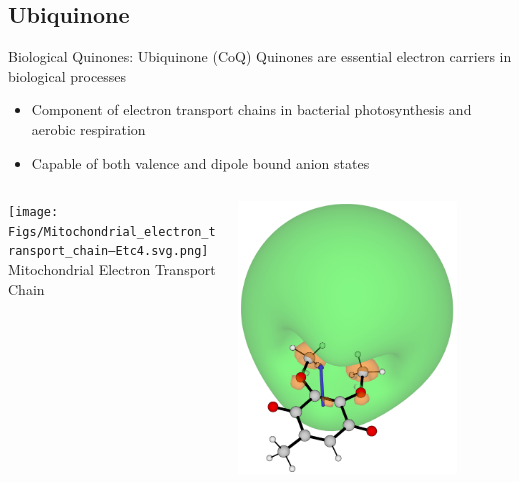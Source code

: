 \documentclass[9pt,t,xcolor=table]{beamer}
\begin{document}
\subsection{Ubiquinone}
\begin{frame}{\huge Biological Quinones: Ubiquinone (CoQ)}\large
	Quinones are essential electron carriers in biological processes
		\vspace{5pt}
		\begin{itemize}
		\item Component of electron transport chains in bacterial photosynthesis and aerobic respiration	
		\item Capable of both valence and dipole bound anion states
		\end{itemize}
		\begin{columns}[b]
			\begin{column}[b]{0.5\textwidth}
				\centering
				\texttt{[image: Figs/Mitochondrial\_electron\_transport\_chain—Etc4.svg.png]}\\
				\vspace{3pt}
				\small Mitochondrial Electron Transport Chain
			\end{column}
			\begin{column}[b]{0.25\textwidth}
				\centering
				\includegraphics[width=0.8\textwidth]{Figs/Q0_181.png}\\

\end{column}
\end{columns}
\end{frame}
\end{document}
